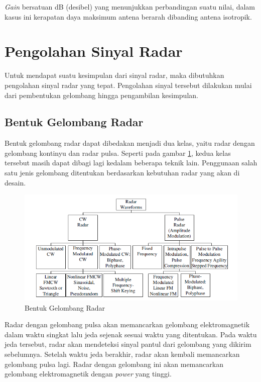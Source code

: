 \textit{Gain} bersatuan dB (desibel) yang menunjukkan perbandingan suatu nilai, dalam kasus ini kerapatan daya maksimum antena berarah dibanding antena isotropik.

\section{Pengolahan Sinyal Radar}
Untuk mendapat suatu kesimpulan dari sinyal radar, maka dibutuhkan pengolahan sinyal radar yang tepat. Pengolahan sinyal tersebut dilakukan mulai dari pembentukan gelombang hingga pengambilan kesimpulan. 

\subsection{Bentuk Gelombang Radar}

Bentuk gelombang radar dapat dibedakan menjadi dua kelas, yaitu radar dengan gelombang kontinyu dan radar pulsa. Seperti pada gambar \ref{pic:bentukgelradar}, kedua kelas tersebut masih dapat dibagi lagi kedalam beberapa teknik lain. Penggunaan salah satu jenis gelombang ditentukan berdasarkan kebutuhan radar yang akan di desain. 

\begin{figure}
	\begin{center}
		\includegraphics[scale=0.8]{pics/bab2/radarwaveform.png}
		\caption[Bentuk Gelombang Radar]{Bentuk Gelombang Radar \cite{Melvin2014}}
		\label{pic:bentukgelradar}
	\end{center}
\end{figure}


Radar dengan gelombang pulsa akan memancarkan gelombang elektromagnetik dalam waktu singkat lalu jeda sejenak sesuai waktu yang ditentukan. Pada waktu jeda tersebut, radar akan mendeteksi sinyal pantul dari gelombang yang dikirim sebelumnya. Setelah waktu jeda berakhir, radar akan kembali memancarkan gelombang pulsa lagi. Radar dengan gelombang ini akan memancarkan gelombang elektromagnetik dengan \textit{power} yang tinggi. 

